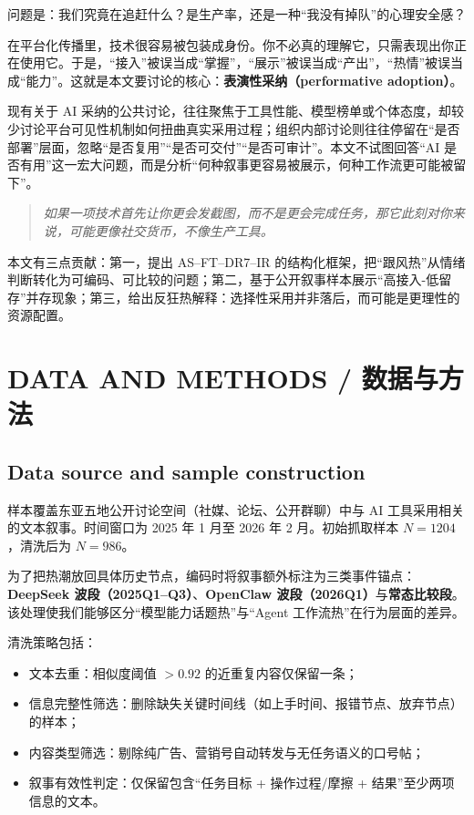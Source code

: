 \documentclass[11pt,a4paper]{ctexart}
\begin{document}
问题是：我们究竟在追赶什么？是生产率，还是一种“我没有掉队”的心理安全感？

在平台化传播里，技术很容易被包装成身份。你不必真的理解它，只需表现出你正在使用它。于是，“接入”被误当成“掌握”，“展示”被误当成“产出”，“热情”被误当成“能力”。这就是本文要讨论的核心：\textbf{表演性采纳（performative adoption）}。

现有关于 AI 采纳的公共讨论，往往聚焦于工具性能、模型榜单或个体态度，却较少讨论平台可见性机制如何扭曲真实采用过程；组织内部讨论则往往停留在“是否部署”层面，忽略“是否复用”“是否可交付”“是否可审计”。本文不试图回答“AI 是否有用”这一宏大问题，而是分析“何种叙事更容易被展示，何种工作流更可能被留下”。

\begin{quote}
\textit{如果一项技术首先让你更会发截图，而不是更会完成任务，那它此刻对你来说，可能更像社交货币，不像生产工具。}
\end{quote}

本文有三点贡献：第一，提出 AS--FT--DR7--IR 的结构化框架，把“跟风热”从情绪判断转化为可编码、可比较的问题；第二，基于公开叙事样本展示“高接入-低留存”并存现象；第三，给出反狂热解释：选择性采用并非落后，而可能是更理性的资源配置。

\twocolumn

\section{DATA AND METHODS / 数据与方法}
\subsection{Data source and sample construction}
样本覆盖东亚五地公开讨论空间（社媒、论坛、公开群聊）中与 AI 工具采用相关的文本叙事。时间窗口为 2025 年 1 月至 2026 年 2 月。初始抓取样本 $N=1204$，清洗后为 $N=986$。

为了把热潮放回具体历史节点，编码时将叙事额外标注为三类事件锚点：\textbf{DeepSeek 波段（2025Q1--Q3）}、\textbf{OpenClaw 波段（2026Q1）}与\textbf{常态比较段}。该处理使我们能够区分“模型能力话题热”与“Agent 工作流热”在行为层面的差异。

清洗策略包括：
\begin{itemize}[leftmargin=1.2em]
\item 文本去重：相似度阈值 $>0.92$ 的近重复内容仅保留一条；
\item 信息完整性筛选：删除缺失关键时间线（如上手时间、报错节点、放弃节点）的样本；
\item 内容类型筛选：剔除纯广告、营销号自动转发与无任务语义的口号帖；
\item 叙事有效性判定：仅保留包含“任务目标 + 操作过程/摩擦 + 结果”至少两项信息的文本。
\end{itemize}
\end{document}
